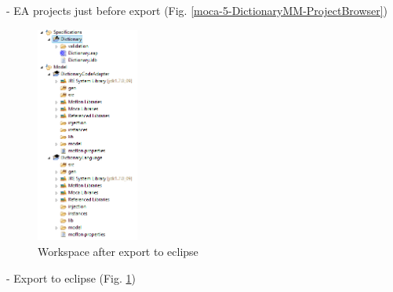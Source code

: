 - EA projects just before export (Fig. \ref{moca-5-DictionaryMM-ProjectBrowser}) 

\begin{figure}[!htbp]
\begin{center}
 \includegraphics[width=0.3\textwidth]{pics/moca/1DictionaryMetaModel/6-ExportToEclipse}
  \caption{Workspace after export to eclipse}
  \label{moca-6-ExportToEclipse}
\end{center}
\end{figure}

- Export to eclipse  (Fig. \ref{moca-6-ExportToEclipse})
